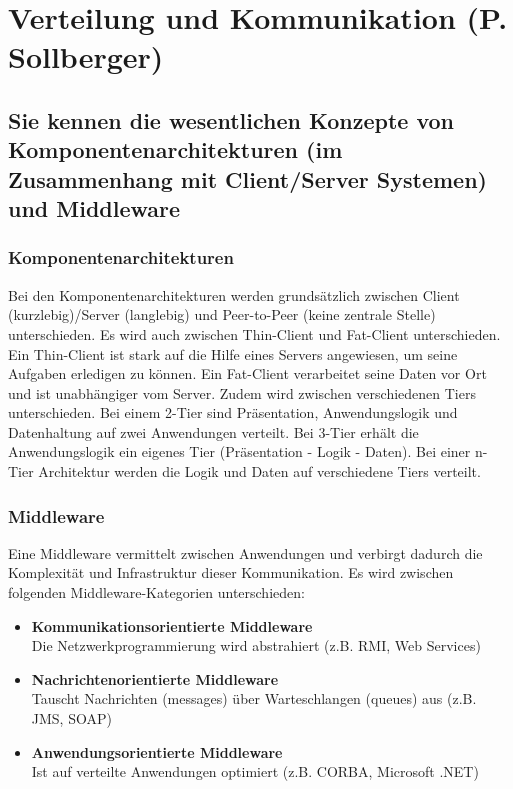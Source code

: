 \section{Verteilung und Kommunikation (P. Sollberger)}
\label{sec:sollberger}

\subsection{Sie kennen die wesentlichen Konzepte von Komponentenarchitekturen (im Zusammenhang mit Client/Server Systemen) und Middleware}

\subsubsection{Komponentenarchitekturen}

Bei den Komponentenarchitekturen werden grundsätzlich zwischen Client (kurzlebig)/Server (langlebig) und Peer-to-Peer (keine zentrale Stelle) unterschieden. Es wird auch zwischen Thin-Client und Fat-Client unterschieden. Ein Thin-Client ist stark auf die Hilfe eines Servers angewiesen, um seine Aufgaben erledigen zu können. Ein Fat-Client verarbeitet seine Daten vor Ort und ist unabhängiger vom Server. Zudem wird zwischen verschiedenen Tiers unterschieden. Bei einem 2-Tier sind Präsentation, Anwendungslogik und Datenhaltung auf zwei Anwendungen verteilt. Bei 3-Tier erhält die Anwendungslogik ein eigenes Tier (Präsentation - Logik - Daten). Bei einer n-Tier Architektur werden die Logik und Daten auf verschiedene Tiers verteilt.

\subsubsection{Middleware}

Eine Middleware vermittelt zwischen Anwendungen und verbirgt dadurch die Komplexität und Infrastruktur dieser Kommunikation. Es wird zwischen folgenden Middleware-Kategorien unterschieden:
\begin{itemize}
	\item \textbf{Kommunikationsorientierte Middleware} \\
		  Die Netzwerkprogrammierung wird abstrahiert (z.B. RMI, Web Services)
	\item \textbf{Nachrichtenorientierte Middleware} \\
		  Tauscht Nachrichten (messages) über Warteschlangen (queues) aus (z.B. JMS, SOAP)
	\item \textbf{Anwendungsorientierte Middleware} \\
		  Ist auf verteilte Anwendungen optimiert (z.B. CORBA, Microsoft .NET)
\end{itemize} 

